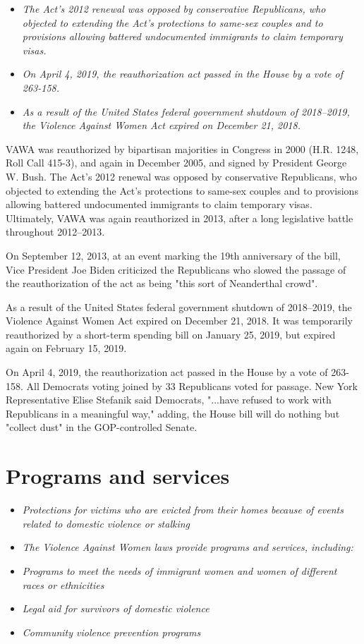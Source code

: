 \begin{itemize}
\item
  \emph{The Act's 2012 renewal was opposed by conservative Republicans,
  who objected to extending the Act's protections to same-sex couples
  and to provisions allowing battered undocumented immigrants to claim
  temporary visas.}
\item
  \emph{On April 4, 2019, the reauthorization act passed in the House by
  a vote of 263-158.}
\item
  \emph{As a result of the United States federal government shutdown of
  2018--2019, the Violence Against Women Act expired on December 21,
  2018.}
\end{itemize}

VAWA was reauthorized by bipartisan majorities in Congress in 2000 (H.R.
1248, Roll Call 415-3), and again in December 2005, and signed by
President George W. Bush. The Act's 2012 renewal was opposed by
conservative Republicans, who objected to extending the Act's
protections to same-sex couples and to provisions allowing battered
undocumented immigrants to claim temporary visas. Ultimately, VAWA was
again reauthorized in 2013, after a long legislative battle throughout
2012--2013.

On September 12, 2013, at an event marking the 19th anniversary of the
bill, Vice President Joe Biden criticized the Republicans who slowed the
passage of the reauthorization of the act as being "this sort of
Neanderthal crowd".

As a result of the United States federal government shutdown of
2018--2019, the Violence Against Women Act expired on December 21, 2018.
It was temporarily reauthorized by a short-term spending bill on January
25, 2019, but expired again on February 15, 2019.

On April 4, 2019, the reauthorization act passed in the House by a vote
of 263-158. All Democrats voting joined by 33 Republicans voted for
passage. New York Representative Elise Stefanik said Democrats, "...have
refused to work with Republicans in a meaningful way," adding, the House
bill will do nothing but "collect dust" in the GOP-controlled Senate.

\section{Programs and services}\label{programs-and-services}

\begin{itemize}
\item
  \emph{Protections for victims who are evicted from their homes because
  of events related to domestic violence or stalking}
\item
  \emph{The Violence Against Women laws provide programs and services,
  including:}
\item
  \emph{Programs to meet the needs of immigrant women and women of
  different races or ethnicities}
\item
  \emph{Legal aid for survivors of domestic violence}
\item
  \emph{Community violence prevention programs}
\end{itemize}

